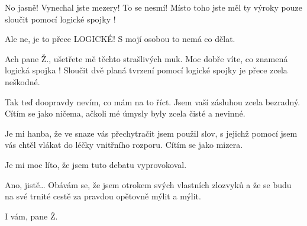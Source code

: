 \documentclass[12pt]{article}
\begin{document}
\begin{description}[itemsep=0pt]
\item[Ž:]

\item[A:] No jasně! Vynechal jste mezery! To se nesmí! Místo toho jste měl ty
    výroky pouze sloučit pomocí logické spojky !

\item[Ž:]

\item[A:] Ale ne, je to přece LOGICKÉ! S mojí osobou to nemá co dělat.

\item[Ž:]

\item[A:] Ach pane Ž., ušetřete mě těchto strašlivých muk. Moc dobře víte, co
    znamená logická spojka ! Sloučit dvě planá tvrzení pomocí logické spojky
     je přece zcela neškodné.

\item[Ž:] 

\item[A:] Tak teď doopravdy nevím, co mám na to říct. Jsem vaší zásluhou
    zcela bezradný. Cítím se jako ničema, ačkoli mé úmysly byly zcela čisté
    a nevinné.

\item[Ž:]

\item[A:] Je mi hanba, že ve snaze vás přechytračit jsem použil slov, s jejichž
    pomocí jsem vás chtěl vlákat do léčky vnitřního rozporu. Cítím se jako mizera.

\item[Ž:]

\item[A:] Je mi moc líto, že jsem tuto debatu vyprovokoval.

\item[Ž:]

\item[A:] Ano, jistě… Obávám se, že jsem otrokem svých vlastních zlozvyků a že
    se budu na své trnité cestě za pravdou opětovně mýlit a mýlit.

\item[Ž:]

\item[A:] I vám, pane Ž.
\end{description}
\end{document}
